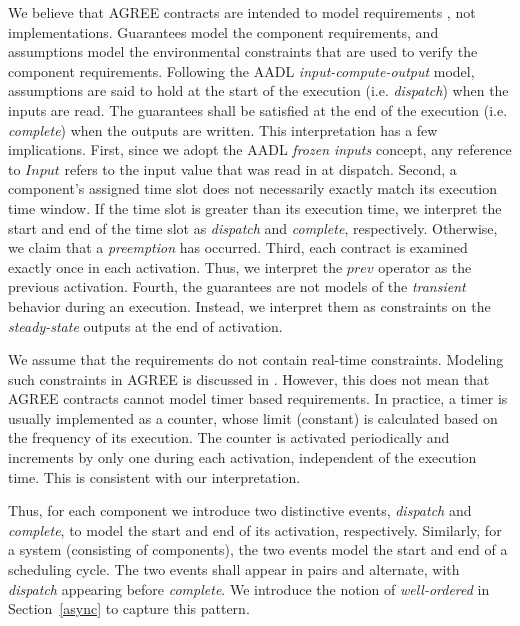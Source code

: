 We believe that AGREE contracts are intended to model requirements \cite{AGREE2}, not implementations. Guarantees model the component requirements, and assumptions model the environmental constraints that are used to verify the component requirements. Following the AADL \emph{input-compute-output} model, assumptions are said to hold at the start of the execution (i.e. \emph{dispatch}) when the inputs are read. The guarantees shall be satisfied at the end of the execution (i.e. \emph{complete}) when the outputs are written. This interpretation has a few implications. 
First, since we adopt the AADL \textit{frozen inputs} concept, any reference to $Input$ refers to the input value that was read in at dispatch.
Second, a component's assigned time slot does not necessarily exactly match its execution time window. If the time slot is greater than its execution time, we interpret the start and end of the time slot as \textit{dispatch} and \textit{complete}, respectively. Otherwise, we claim that a \textit{preemption} has occurred.
Third, each contract is examined exactly once in each activation. Thus, we interpret the $prev$ operator as the previous activation. 
Fourth, the guarantees are not models of the \emph{transient} behavior during an execution. Instead, we interpret them as constraints on the \emph{steady-state} outputs at the end of activation.

We assume that the requirements do not contain real-time constraints. Modeling such constraints in AGREE is discussed in \cite{rtAGREE}.
However, this does not mean that AGREE contracts cannot model timer based requirements. In practice, a timer is usually implemented as a counter, whose limit (constant) is calculated based on the frequency of its execution. The counter is activated periodically and increments by only one during each activation, independent of the execution time. This is consistent with our interpretation.

Thus, for each component we introduce two distinctive events, \emph{dispatch} and \emph{complete}, to model the start and end of its activation, respectively. 
Similarly, for a system (consisting of components), the two events model the start and end of a scheduling cycle. 
The two events shall appear in pairs and alternate, with \emph{dispatch} appearing before \emph{complete}. We introduce the notion of \emph{well-ordered} in Section~\ref{async} to capture this pattern.

